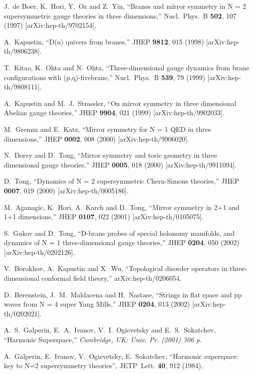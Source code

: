 \documentclass[a4paper,12pt, amsfonts, amssymb]{article}
\begin{document}
\begin{thebibliography}{99}
J.~de Boer, K.~Hori, Y.~Oz and Z.~Yin,
``Branes and mirror symmetry in N = 2 supersymmetric gauge theories in  three dimensions,''
Nucl.\ Phys.\ B {\bf 502}, 107 (1997)
[arXiv:hep-th/9702154].

A.~Kapustin, ``D(n) quivers from branes,''
JHEP {\bf 9812}, 015 (1998) [arXiv:hep-th/9806238].

T.~Kitao, K.~Ohta and N.~Ohta,
``Three-dimensional gauge dynamics from brane configurations with  (p,q)-fivebrane,''
Nucl.\ Phys.\ B {\bf 539}, 79 (1999)
[arXiv:hep-th/9808111].

A.~Kapustin and M.~J.~Strassler,
``On mirror symmetry in three dimensional Abelian gauge theories,''
JHEP {\bf 9904}, 021 (1999) [arXiv:hep-th/9902033].

M.~Gremm and E.~Katz, ``Mirror symmetry for N = 1 QED in three dimensions,''
JHEP {\bf 0002}, 008 (2000) [arXiv:hep-th/9906020].

N.~Dorey and D.~Tong, ``Mirror symmetry and toric geometry in three dimensional gauge theories,'' JHEP {\bf 0005}, 018 (2000) [arXiv:hep-th/9911094].

D.~Tong, ``Dynamics of N = 2 supersymmetric Chern-Simons theories,''
JHEP {\bf 0007}, 019 (2000) [arXiv:hep-th/0005186].

M.~Aganagic, K.~Hori, A.~Karch and D.~Tong,
``Mirror symmetry in 2+1 and 1+1 dimensions,''
JHEP {\bf 0107}, 022 (2001) [arXiv:hep-th/0105075].

S.~Gukov and D.~Tong, ``D-brane probes of special holonomy manifolds, and dynamics of N = 1  three-dimensional gauge theories,''
JHEP {\bf 0204}, 050 (2002) [arXiv:hep-th/0202126].

V.~Borokhov, A.~Kapustin and X.~Wu,
``Topological disorder operators in three-dimensional conformal field 
theory,'' arXiv:hep-th/0206054.

D.~Berenstein, J.~M.~Maldacena and H.~Nastase,
``Strings in flat space and pp waves from N = 4 super Yang Mills,''
JHEP {\bf 0204}, 013 (2002) [arXiv:hep-th/0202021].

A.~S.~Galperin, E.~A.~Ivanov, V.~I.~Ogievetsky and E.~S.~Sokatchev,
``Harmonic Superspace,'' {\it  Cambridge, UK: Univ. Pr. (2001) 306 p}.

 A.~Galperin, E.~Ivanov, V.~Ogievetsky, E.~Sokatchev, ``Harmonic superspace:
key to N=2 supersymmetry theories'', JETP\ Lett. {\bf 40}, 912 (1984).


\end{thebibliography}
\end{document}
